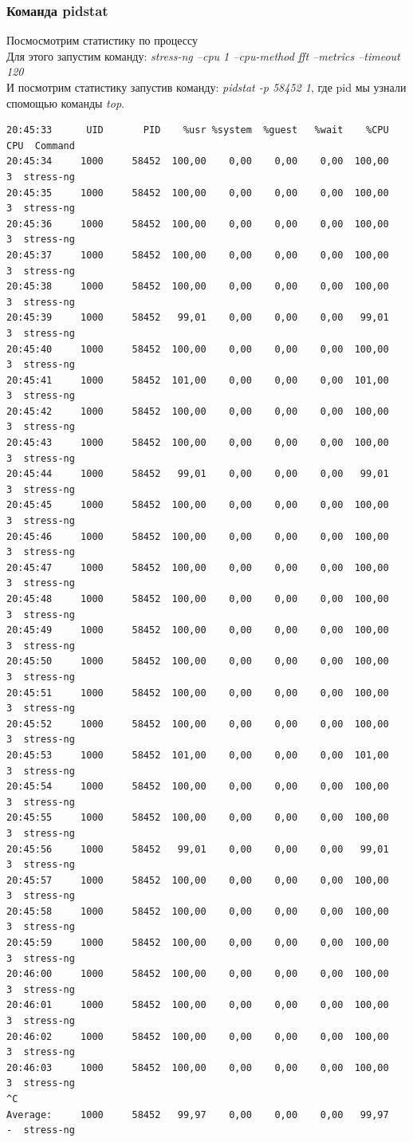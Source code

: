 \subsubsection{Команда pidstat}
Посмосмотрим статистику по процессу\\
Для этого запустим команду: \textit{stress-ng --cpu 1 --cpu-method fft --metrics --timeout 120}\\
И посмотрим статистику запустив команду: \textit{pidstat -p 58452 1}, где pid мы узнали спомощью команды \textit{top}.
\begin{verbatim}
20:45:33      UID       PID    %usr %system  %guest   %wait    %CPU   CPU  Command
20:45:34     1000     58452  100,00    0,00    0,00    0,00  100,00     3  stress-ng
20:45:35     1000     58452  100,00    0,00    0,00    0,00  100,00     3  stress-ng
20:45:36     1000     58452  100,00    0,00    0,00    0,00  100,00     3  stress-ng
20:45:37     1000     58452  100,00    0,00    0,00    0,00  100,00     3  stress-ng
20:45:38     1000     58452  100,00    0,00    0,00    0,00  100,00     3  stress-ng
20:45:39     1000     58452   99,01    0,00    0,00    0,00   99,01     3  stress-ng
20:45:40     1000     58452  100,00    0,00    0,00    0,00  100,00     3  stress-ng
20:45:41     1000     58452  101,00    0,00    0,00    0,00  101,00     3  stress-ng
20:45:42     1000     58452  100,00    0,00    0,00    0,00  100,00     3  stress-ng
20:45:43     1000     58452  100,00    0,00    0,00    0,00  100,00     3  stress-ng
20:45:44     1000     58452   99,01    0,00    0,00    0,00   99,01     3  stress-ng
20:45:45     1000     58452  100,00    0,00    0,00    0,00  100,00     3  stress-ng
20:45:46     1000     58452  100,00    0,00    0,00    0,00  100,00     3  stress-ng
20:45:47     1000     58452  100,00    0,00    0,00    0,00  100,00     3  stress-ng
20:45:48     1000     58452  100,00    0,00    0,00    0,00  100,00     3  stress-ng
20:45:49     1000     58452  100,00    0,00    0,00    0,00  100,00     3  stress-ng
20:45:50     1000     58452  100,00    0,00    0,00    0,00  100,00     3  stress-ng
20:45:51     1000     58452  100,00    0,00    0,00    0,00  100,00     3  stress-ng
20:45:52     1000     58452  100,00    0,00    0,00    0,00  100,00     3  stress-ng
20:45:53     1000     58452  101,00    0,00    0,00    0,00  101,00     3  stress-ng
20:45:54     1000     58452  100,00    0,00    0,00    0,00  100,00     3  stress-ng
20:45:55     1000     58452  100,00    0,00    0,00    0,00  100,00     3  stress-ng
20:45:56     1000     58452   99,01    0,00    0,00    0,00   99,01     3  stress-ng
20:45:57     1000     58452  100,00    0,00    0,00    0,00  100,00     3  stress-ng
20:45:58     1000     58452  100,00    0,00    0,00    0,00  100,00     3  stress-ng
20:45:59     1000     58452  100,00    0,00    0,00    0,00  100,00     3  stress-ng
20:46:00     1000     58452  100,00    0,00    0,00    0,00  100,00     3  stress-ng
20:46:01     1000     58452  100,00    0,00    0,00    0,00  100,00     3  stress-ng
20:46:02     1000     58452  100,00    0,00    0,00    0,00  100,00     3  stress-ng
20:46:03     1000     58452  100,00    0,00    0,00    0,00  100,00     3  stress-ng
^C
Average:     1000     58452   99,97    0,00    0,00    0,00   99,97     -  stress-ng
\end{verbatim}
